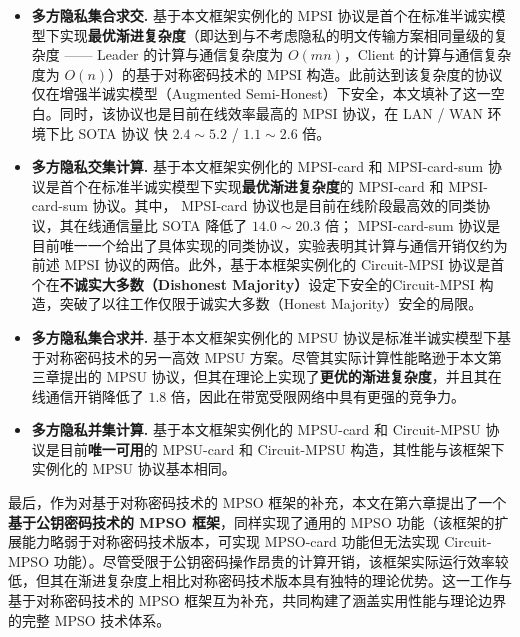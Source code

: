 \begin{itemize}
    \item \textbf{多方隐私集合求交.} 基于本文框架实例化的 MPSI 协议是首个在标准半诚实模型下实现\textbf{最优渐进复杂度}（即达到与不考虑隐私的明文传输方案相同量级的复杂度 —— Leader 的计算与通信复杂度为 $O(mn)$，Client 的计算与通信复杂度为 $O(n)$）的基于对称密码技术的 MPSI 构造。此前达到该复杂度的协议 \cite{KMPRT-CCS-2017} 仅在增强半诚实模型（Augmented Semi-Honest）下安全，本文填补了这一空白。同时，该协议也是目前在线效率最高的 MPSI 协议，在 LAN / WAN 环境下比 SOTA 协议 \cite{WuYC24} 快 $2.4 \sim 5.2$ / $1.1 \sim 2.6$ 倍。
    
    \item \textbf{多方隐私交集计算.} 基于本文框架实例化的 MPSI-card 和 MPSI-card-sum 协议是首个在标准半诚实模型下实现\textbf{最优渐进复杂度}的 MPSI-card 和 MPSI-card-sum 协议。其中， MPSI-card 协议也是目前在线阶段最高效的同类协议，其在线通信量比 SOTA \cite{ChenDGB22} 降低了 $14.0 \sim 20.3$ 倍； MPSI-card-sum 协议是目前唯一一个给出了具体实现的同类协议，实验表明其计算与通信开销仅约为前述 MPSI 协议的两倍。此外，基于本框架实例化的 Circuit-MPSI 协议是首个在\textbf{不诚实大多数（Dishonest Majority）}设定下安全的Circuit-MPSI 构造，突破了以往工作仅限于诚实大多数（Honest Majority）安全的局限。
    
    \item \textbf{多方隐私集合求并.} 基于本文框架实例化的 MPSU 协议是标准半诚实模型下基于对称密码技术的另一高效 MPSU 方案。尽管其实际计算性能略逊于本文第三章提出的 MPSU 协议，但其在理论上实现了\textbf{更优的渐进复杂度}，并且其在线通信开销降低了 $1.8$ 倍，因此在带宽受限网络中具有更强的竞争力。
    
    \item \textbf{多方隐私并集计算.} 基于本文框架实例化的 MPSU-card 和 Circuit-MPSU 协议是目前\textbf{唯一可用}的 MPSU-card 和 Circuit-MPSU 构造，其性能与该框架下实例化的 MPSU 协议基本相同。
\end{itemize}
    
    最后，作为对基于对称密码技术的 MPSO 框架的补充，本文在第六章提出了一个\textbf{基于公钥密码技术的 MPSO 框架}，同样实现了通用的 MPSO  功能（该框架的扩展能力略弱于对称密码技术版本，可实现 MPSO-card 功能但无法实现 Circuit-MPSO 功能）。尽管受限于公钥密码操作昂贵的计算开销，该框架实际运行效率较低，但其在渐进复杂度上相比对称密码技术版本具有独特的理论优势。这一工作与基于对称密码技术的 MPSO 框架互为补充，共同构建了涵盖实用性能与理论边界的完整 MPSO 技术体系。



